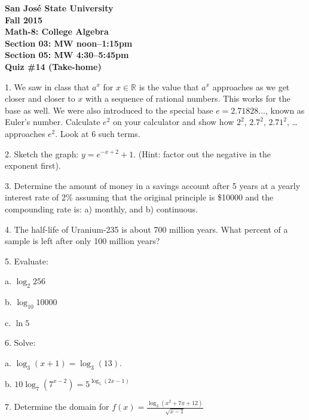 \documentclass[letterpaper, 12pt]{article}
\begin{document}
\begin{center}
\bfseries
San Jos\'{e} State University \\
Fall 2015 \\
Math-8: College Algebra \\
Section 03: MW noon--1:15pm \\
Section 05: MW 4:30--5:45pm \\
\bigskip
Quiz \#14 (Take-home)
\end{center}

\bigskip

1. We saw in class that $a^x$ for $x\in\mathbb{R}$ is the value that $a^x$
approaches as we get closer and closer to $x$ with a sequence of rational
numbers. This works for the base as well. We were also introduced to the
special base $e=2.71828\ldots$, known as Euler's number. Calculate $e^2$ on
your calculator and show how $2^2$, $2.7^2$, $2.71^2$, \ldots approaches
$e^2$. Look at 6 such terms.

\bigskip

2. Sketch the graph: $y=e^{-x+2}+1$. (Hint: factor out the negative in the
exponent first).

\bigskip

3. Determine the amount of money in a savings account after 5 years at a yearly
interest rate of 2\% assuming that the original principle is \$10000 and the
compounding rate is: a) monthly, and b) continuous.

\bigskip

4. The half-life of Uranium-235 is about 700 million years. What percent of a
sample is left after only 100 million years?

\bigskip

5. Evaluate:

\bigskip

a. $\log_2 256$

\bigskip

b. $\log_{10} 10000$

\bigskip

c. $\ln 5$

\bigskip

6. Solve:

\bigskip

a. $\log_3(x+1)=\log_3(13)$.

\bigskip

b. $10\log_7(7^{x-2})=5^{\log_5(2x-1)}$

\bigskip

7. Determine the domain for $f(x)=\frac{\log_3(x^2+7x+12)}{\sqrt{x-1}}$
\end{document}
